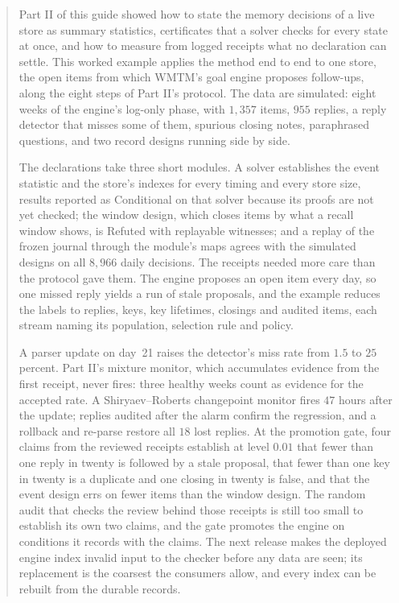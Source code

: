 \documentclass[11pt]{article}
\theoremstyle{definition}
\theoremstyle{plain}
\begin{document}
\begin{abstract}
\noindent
Part II of this guide showed how to state the memory decisions of a live store as summary
statistics, certificates that a solver checks for every state at once, and how to measure from
logged receipts what no declaration can settle. This worked example applies the method end to end
to one store, the open items from which WMTM's goal engine proposes follow-ups, along the eight
steps of Part II's protocol. The data are simulated: eight weeks of the engine's log-only phase,
with $1{,}357$ items, $955$ replies, a reply detector that misses some of them, spurious closing
notes, paraphrased questions, and two record designs running side by side.

The declarations take three short modules. A solver establishes the event statistic and the
store's indexes for every timing and every store size, results reported as Conditional on that
solver because its proofs are not yet checked; the window design, which closes items by what a
recall window shows, is Refuted with replayable witnesses; and a replay of the frozen journal
through the module's maps agrees with the simulated designs on all $8{,}966$ daily decisions. The
receipts needed more care than the protocol gave them. The engine proposes an open item every day,
so one missed reply yields a run of stale proposals, and the example reduces the labels to
replies, keys, key lifetimes, closings and audited items, each stream naming its population,
selection rule and policy.

A parser update on day~21 raises the detector's miss rate from $1.5$ to $25$ percent. Part II's
mixture monitor, which accumulates evidence from the first receipt, never fires: three healthy
weeks count as evidence for the accepted rate. A Shiryaev--Roberts changepoint monitor fires $47$
hours after the update; replies audited after the alarm confirm the regression, and a rollback and
re-parse restore all $18$ lost replies. At the promotion gate, four claims from the reviewed receipts
establish at level $0.01$ that fewer than one reply in twenty is followed by a stale proposal,
that fewer than one key in twenty is a duplicate and one closing in twenty is false, and that the
event design errs on fewer items than the window design. The random audit that checks the review
behind those receipts is still too small to establish its own two claims, and the gate promotes
the engine on conditions it records with the claims. The next release makes the deployed engine
index invalid input to the checker before any data are seen; its replacement is the coarsest the
consumers allow, and every index can be rebuilt from the durable records.
\end{abstract}
\end{document}

